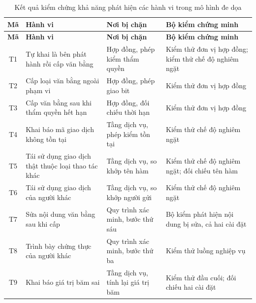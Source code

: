 \begin{longtable}{|c|p{3.9cm}|p{3.4cm}|p{4.5cm}|}
\caption{Kết quả kiểm chứng khả năng phát hiện các hành vi trong mô hình đe dọa}
\label{tab:detection-results} \\

\hline
\textbf{Mã} & \textbf{Hành vi} & \textbf{Nơi bị chặn} & \textbf{Bộ kiểm chứng minh} \\
\hline
\endfirsthead

\hline
\textbf{Mã} & \textbf{Hành vi} & \textbf{Nơi bị chặn} & \textbf{Bộ kiểm chứng minh} \\
\hline
\endhead

\hline
\endfoot

\hline
\endlastfoot

T1 & Tự khai là bên phát hành rồi cấp văn bằng
& Hợp đồng, phép kiểm thẩm quyền
& Kiểm thử đơn vị hợp đồng; kiểm thử chế độ nghiêm ngặt
\\ \hline

T2 & Cấp loại văn bằng ngoài phạm vi
& Hợp đồng, phép giao bit
& Kiểm thử đơn vị hợp đồng
\\ \hline

T3 & Cấp văn bằng sau khi thẩm quyền hết hạn
& Hợp đồng, đối chiếu thời hạn
& Kiểm thử đơn vị hợp đồng
\\ \hline

T4 & Khai báo mã giao dịch không tồn tại
& Tầng dịch vụ, phép kiểm tồn tại
& Kiểm thử chế độ nghiêm ngặt
\\ \hline

T5 & Tái sử dụng giao dịch thật thuộc loại thao tác khác
& Tầng dịch vụ, so khớp tên hàm
& Kiểm thử chế độ nghiêm ngặt; đối chiếu tên hàm
\\ \hline

T6 & Tái sử dụng giao dịch của người khác
& Tầng dịch vụ, so khớp người gửi
& Kiểm thử chế độ nghiêm ngặt
\\ \hline

T7 & Sửa nội dung văn bằng sau khi cấp
& Quy trình xác minh, bước thứ sáu
& Bộ kiểm phát hiện nội dung bị sửa, cả hai cài đặt
\\ \hline

T8 & Trình bày chứng thực của người khác
& Quy trình xác minh, bước thứ ba
& Kiểm thử luồng nghiệp vụ
\\ \hline

T9 & Khai báo giá trị băm sai
& Tầng dịch vụ, tính lại giá trị băm
& Kiểm thử đầu cuối; đối chiếu hai cài đặt
\\ \hline


\end{longtable}
